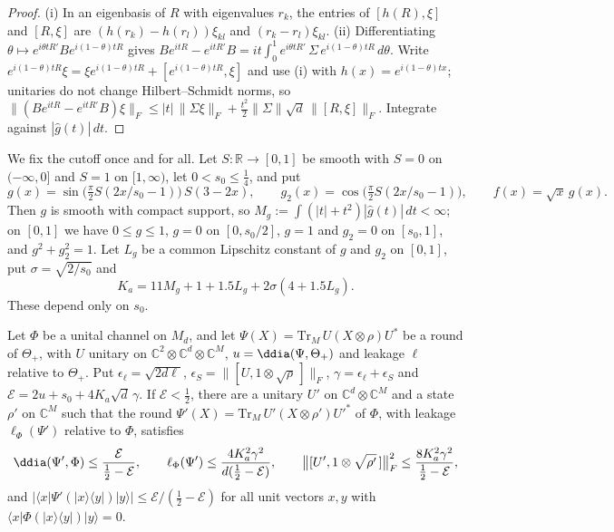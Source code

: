 \begin{proof}
(i) In an eigenbasis of $R$ with eigenvalues $r_k$, the entries of $[h(R),\xi]$ and $[R,\xi]$ are $(h(r_k)-h(r_l))\xi_{kl}$ and $(r_k-r_l)\xi_{kl}$.
(ii) Differentiating $\theta\mapsto e^{i\theta tR'}Be^{i(1-\theta)tR}$ gives
$Be^{itR}-e^{itR'}B=it\int_0^1e^{i\theta tR'}\,\Sigma\,e^{i(1-\theta)tR}\,d\theta$. Write $e^{i(1-\theta)tR}\xi=\xi e^{i(1-\theta)tR}+[e^{i(1-\theta)tR},\xi]$ and use
(i) with $h(x)=e^{i(1-\theta)tx}$; unitaries do not change Hilbert--Schmidt norms, so
$\|(Be^{itR}-e^{itR'}B)\xi\|_F\le|t|\,\|\Sigma\xi\|_F+\frac{t^2}2\|\Sigma\|\sqrt d\,\|[R,\xi]\|_F$. Integrate against $|\hat g(t)|\,dt$.
\end{proof}

We fix the cutoff once and for all. Let $S:\mathbb R\to[0,1]$ be smooth with $S=0$ on $(-\infty,0]$ and $S=1$ on $[1,\infty)$, let $0<s_0\le\frac14$, and put
\[
g(x)=\sin\bigl(\tfrac\pi2S(2x/s_0-1)\bigr)\,S(3-2x),\qquad g_2(x)=\cos\bigl(\tfrac\pi2S(2x/s_0-1)\bigr),\qquad f(x)=\sqrt x\,g(x).
\]
Then $g$ is smooth with compact support, so $M_g:=\int(|t|+t^2)|\hat g(t)|\,dt<\infty$; on $[0,1]$ we have $0\le g\le1$, $g=0$ on $[0,s_0/2]$,
$g=1$ and $g_2=0$ on $[s_0,1]$, and $g^2+g_2^2=1$. Let $L_g$ be a common Lipschitz constant of $g$ and $g_2$ on $[0,1]$, put $\sigma=\sqrt{2/s_0}$ and
\[
K_a=11M_g+1+1.5L_g+2\sigma(4+1.5L_g).
\]
These depend only on $s_0$.

\begin{lemma}\label{lem:block-extraction}
Let $\Phi$ be a unital channel on $M_d$, and let $\Psi(X)=\mathrm{Tr}_M\,U(X\otimes\rho)U^*$ be a round of $\Theta_+$, with $U$ unitary on
$\mathbb C^2\otimes\mathbb C^d\otimes\mathbb C^M$, $u=\ddia(\Psi,\Theta_+)$ and leakage $\ell$ relative to $\Theta_+$. Put
$\epsilon_\ell=\sqrt{2d\ell}$, $\epsilon_S=\|[U,1\otimes\sqrt\rho\,]\|_F$, $\gamma=\epsilon_\ell+\epsilon_S$ and $\mathcal E=2u+s_0+4K_a\sqrt d\,\gamma$. If $\mathcal E<\frac12$,
there are a unitary $U'$ on $\mathbb C^d\otimes\mathbb C^M$ and a state $\rho'$ on $\mathbb C^M$ such that the round
$\Psi'(X)=\mathrm{Tr}_M\,U'(X\otimes\rho')U'^*$ of $\Phi$, with leakage $\ell_\Phi(\Psi')$ relative to $\Phi$, satisfies
\[
\ddia(\Psi',\Phi)\le\frac{\mathcal E}{\frac12-\mathcal E},\qquad \ell_\Phi(\Psi')\le\frac{4K_a^2\gamma^2}{d(\frac12-\mathcal E)},\qquad
\bigl\|[U',1\otimes\sqrt{\rho'}\,]\bigr\|_F^2\le\frac{8K_a^2\gamma^2}{\frac12-\mathcal E},
\]
and $|\langle x|\Psi'(|x\rangle\langle y|)|y\rangle|\le \mathcal E/(\frac12-\mathcal E)$ for all unit vectors $x,y$ with $\langle x|\Phi(|x\rangle\langle y|)|y\rangle=0$.
\end{lemma}

